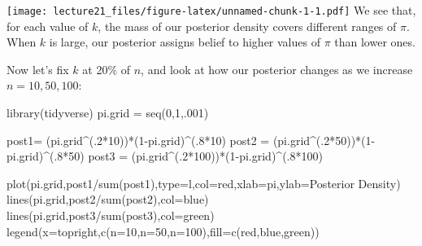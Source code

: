 \documentclass[
]{article}
\newenvironment{Shaded}{\begin{snugshade}}{\end{snugshade}}
\newcommand{\AttributeTok}[1]{\textcolor[rgb]{0.77,0.63,0.00}{#1}}
\newcommand{\DecValTok}[1]{\textcolor[rgb]{0.00,0.00,0.81}{#1}}
\newcommand{\FunctionTok}[1]{\textcolor[rgb]{0.00,0.00,0.00}{#1}}
\newcommand{\NormalTok}[1]{#1}
\newcommand{\OtherTok}[1]{\textcolor[rgb]{0.56,0.35,0.01}{#1}}
\newcommand{\SpecialCharTok}[1]{\textcolor[rgb]{0.00,0.00,0.00}{#1}}
\newcommand{\StringTok}[1]{\textcolor[rgb]{0.31,0.60,0.02}{#1}}
\begin{document}
\texttt{[image: lecture21\_files/figure-latex/unnamed-chunk-1-1.pdf]} We
see that, for each value of \(k\), the mass of our posterior density
covers different ranges of \(\pi\). When \(k\) is large, our posterior
assigns belief to higher values of \(\pi\) than lower ones.

Now let's fix \(k\) at 20\% of \(n\), and look at how our posterior
changes as we increase \(n=10,50,100\):

\begin{Shaded}
\begin{Highlighting}[]
\FunctionTok{library}\NormalTok{(tidyverse)}
\NormalTok{pi.grid }\OtherTok{=} \FunctionTok{seq}\NormalTok{(}\DecValTok{0}\NormalTok{,}\DecValTok{1}\NormalTok{,.}\DecValTok{001}\NormalTok{)}

\NormalTok{post1}\OtherTok{=}\NormalTok{ (pi.grid}\SpecialCharTok{\^{}}\NormalTok{(.}\DecValTok{2}\SpecialCharTok{*}\DecValTok{10}\NormalTok{))}\SpecialCharTok{*}\NormalTok{(}\DecValTok{1}\SpecialCharTok{{-}}\NormalTok{pi.grid)}\SpecialCharTok{\^{}}\NormalTok{(.}\DecValTok{8}\SpecialCharTok{*}\DecValTok{10}\NormalTok{)}
\NormalTok{post2 }\OtherTok{=}\NormalTok{ (pi.grid}\SpecialCharTok{\^{}}\NormalTok{(.}\DecValTok{2}\SpecialCharTok{*}\DecValTok{50}\NormalTok{))}\SpecialCharTok{*}\NormalTok{(}\DecValTok{1}\SpecialCharTok{{-}}\NormalTok{pi.grid)}\SpecialCharTok{\^{}}\NormalTok{(.}\DecValTok{8}\SpecialCharTok{*}\DecValTok{50}\NormalTok{)}
\NormalTok{post3 }\OtherTok{=}\NormalTok{ (pi.grid}\SpecialCharTok{\^{}}\NormalTok{(.}\DecValTok{2}\SpecialCharTok{*}\DecValTok{100}\NormalTok{))}\SpecialCharTok{*}\NormalTok{(}\DecValTok{1}\SpecialCharTok{{-}}\NormalTok{pi.grid)}\SpecialCharTok{\^{}}\NormalTok{(.}\DecValTok{8}\SpecialCharTok{*}\DecValTok{100}\NormalTok{)}


\FunctionTok{plot}\NormalTok{(pi.grid,post1}\SpecialCharTok{/}\FunctionTok{sum}\NormalTok{(post1),}\AttributeTok{type=}\StringTok{\textquotesingle{}l\textquotesingle{}}\NormalTok{,}\AttributeTok{col=}\StringTok{\textquotesingle{}red\textquotesingle{}}\NormalTok{,}\AttributeTok{xlab=}\StringTok{\textquotesingle{}pi\textquotesingle{}}\NormalTok{,}\AttributeTok{ylab=}\StringTok{\textquotesingle{}Posterior Density\textquotesingle{}}\NormalTok{)}
\FunctionTok{lines}\NormalTok{(pi.grid,post2}\SpecialCharTok{/}\FunctionTok{sum}\NormalTok{(post2),}\AttributeTok{col=}\StringTok{\textquotesingle{}blue\textquotesingle{}}\NormalTok{)}
\FunctionTok{lines}\NormalTok{(pi.grid,post3}\SpecialCharTok{/}\FunctionTok{sum}\NormalTok{(post3),}\AttributeTok{col=}\StringTok{\textquotesingle{}green\textquotesingle{}}\NormalTok{)}
\FunctionTok{legend}\NormalTok{(}\AttributeTok{x=}\StringTok{\textquotesingle{}topright\textquotesingle{}}\NormalTok{,}\FunctionTok{c}\NormalTok{(}\StringTok{\textquotesingle{}n=10\textquotesingle{}}\NormalTok{,}\StringTok{\textquotesingle{}n=50\textquotesingle{}}\NormalTok{,}\StringTok{\textquotesingle{}n=100\textquotesingle{}}\NormalTok{),}\AttributeTok{fill=}\FunctionTok{c}\NormalTok{(}\StringTok{\textquotesingle{}red\textquotesingle{}}\NormalTok{,}\StringTok{\textquotesingle{}blue\textquotesingle{}}\NormalTok{,}\StringTok{\textquotesingle{}green\textquotesingle{}}\NormalTok{))}
\end{Highlighting}
\end{Shaded}
\end{document}
